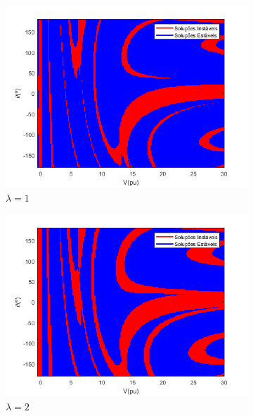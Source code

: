 \clearpage
\begin{figure}[H]
    \centering
    \caption{Mapa Fractal FPMO - IEEE 33 Barras}
    \begin{subfigure}[b]{0.45\textwidth}
        \centering
        \includegraphics[width=\textwidth]{textuais/capitulo4/figuras/33_FPOM_NOM.png}
        \caption{$\lambda=1$}
    \end{subfigure}
    \vfill
    \begin{subfigure}[b]{0.45\textwidth}
        \centering
        \includegraphics[width=\textwidth]{textuais/capitulo4/figuras/33_FPOM_2lambda.png}
        \caption{$\lambda=2$}
    \end{subfigure}
    \vfill
    \begin{subfigure}[b]{0.45\textwidth}

\end{subfigure}
\end{figure}
